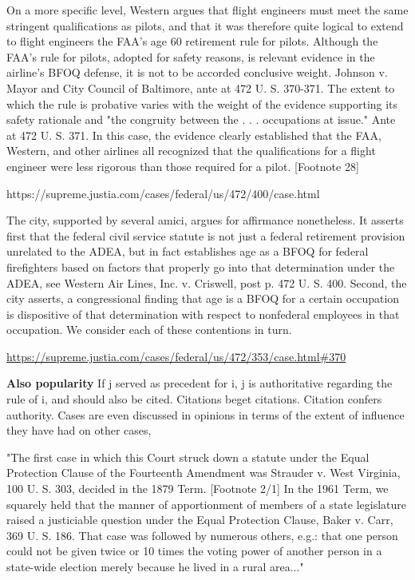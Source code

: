\documentclass[headsepline=true, abstracton]{scrartcl}
\begin{document}
On a more specific level, Western argues that flight engineers must meet the same stringent qualifications as pilots, and that it was therefore quite logical to extend to flight engineers the FAA's age 60 retirement rule for pilots. Although the FAA's rule for pilots, adopted for safety reasons, is relevant evidence in the airline's BFOQ defense, it is not to be accorded conclusive weight. Johnson v. Mayor and City Council of Baltimore, ante at 472 U. S. 370-371. The extent to which the rule is probative varies with the weight of the evidence supporting its safety rationale and "the congruity between the . . . occupations at issue." Ante at 472 U. S. 371. In this case, the evidence clearly established that the FAA, Western, and other airlines all recognized that the qualifications for a flight engineer were less rigorous than those required for a pilot. [Footnote 28]

https://supreme.justia.com/cases/federal/us/472/400/case.html

The city, supported by several amici, argues for affirmance nonetheless. It asserts first that the federal civil service statute is not just a federal retirement provision unrelated to the ADEA, but in fact establishes age as a BFOQ for federal firefighters based on factors that properly go into that determination under the ADEA, see Western Air Lines, Inc. v. Criswell, post p. 472 U. S. 400. Second, the city asserts, a congressional finding that age is a BFOQ for a certain occupation is dispositive of that determination with respect to nonfederal employees in that occupation. We consider each of these contentions in turn.

\url{https://supreme.justia.com/cases/federal/us/472/353/case.html#370}

\textbf{Also popularity} If j served as precedent for i, j is authoritative regarding the rule of i, and should also be cited. Citations beget citations. Citation confers authority. Cases are even discussed in opinions in terms of the extent of influence they have had on other cases,

"The first case in which this Court struck down a statute under the Equal Protection Clause of the Fourteenth Amendment was Strauder v. West Virginia, 100 U. S. 303, decided in the 1879 Term. [Footnote 2/1] In the 1961 Term, we squarely held that the manner of apportionment of members of a state legislature raised a justiciable question under the Equal Protection Clause, Baker v. Carr, 369 U. S. 186. That case was followed by numerous others, e.g.: that one person could not be given twice or 10 times the voting power of another person in a state-wide election merely because he lived in a rural area..."
\end{document}
